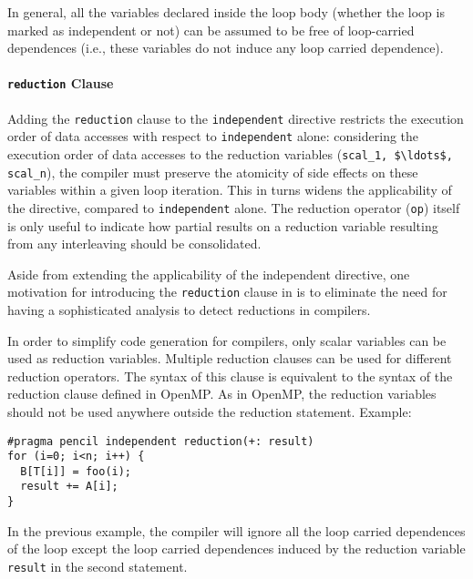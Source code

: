   In general, all the variables declared inside the loop body (whether the loop
  is marked as independent or not) can be assumed to be free of loop-carried
  dependences (i.e., these variables do not induce any loop carried dependence).
  
  \paragraph{\texttt{reduction} Clause}
  \label{reduction-clause}

  Adding the \lstinline!reduction! clause to the \lstinline!independent!
  directive restricts the execution order of data accesses with respect
  to \lstinline!independent! alone: considering 
  the execution order of data accesses to the reduction variables
  (\lstinline!scal_1, $\ldots$, scal_n!), the compiler must preserve
  the atomicity of side effects on these variables within a given
  loop iteration.
  This in turns widens the applicability of the directive, compared to
  \lstinline!independent! alone.
  The reduction operator (\lstinline!op!) itself is only useful to
  indicate how partial results on a reduction variable resulting from
  any interleaving should be consolidated.

  Aside from extending the applicability of the independent directive, one
  motivation for introducing the \lstinline!reduction!
  clause in \pencil is to eliminate the need for having a sophisticated
  analysis to detect reductions in \pencil compilers.

  In order to simplify code generation for \pencil compilers, only scalar
  variables can be used as reduction variables.
  Multiple reduction clauses can be used for different reduction operators.
  The syntax of this clause is equivalent to the syntax of the reduction clause
  defined in OpenMP.  As in OpenMP, the reduction variables should not
  be used anywhere outside the reduction statement.  Example:
  \begin{lstlisting}[language=pencil]
#pragma pencil independent reduction(+: result)
for (i=0; i<n; i++) {
  B[T[i]] = foo(i);
  result += A[i];
}
  \end{lstlisting}
  In the previous example, the compiler will ignore all the loop carried
  dependences of the loop except the loop carried dependences induced by
  the reduction variable \lstinline!result! in the second statement.

